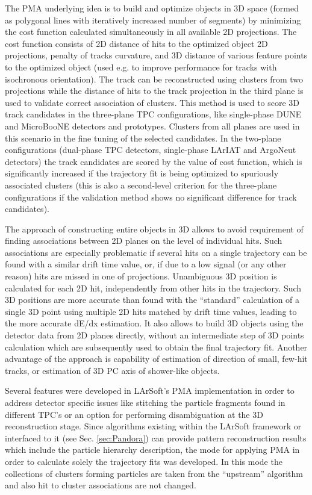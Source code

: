 The PMA underlying idea is to build and optimize objects in 3D space (formed as polygonal lines with iteratively increased number of segments) by minimizing the cost function calculated simultaneously in all available 2D projections. The cost function consists of 2D distance of hits to the optimized object 2D projections, penalty of tracks curvature, and 3D distance of various feature points to the optimized object (used e.g. to improve performance for tracks with isochronous orientation). The track can be reconstructed using clusters from two projections while the distance of hits to the track projection in the third plane is used to validate correct association of clusters. This method is used to score 3D track candidates in the three-plane TPC configurations, like single-phase DUNE and MicroBooNE detectors and prototypes. Clusters from all planes are used in this scenario in the fine tuning of the selected candidates. In the two-plane configurations (dual-phase TPC detectors, single-phase LArIAT and ArgoNeut  detectors) the track candidates are scored by the value of cost function, which is significantly increased if the trajectory fit is being optimized to spuriously associated clusters (this is also a second-level criterion for the three-plane configurations if the validation method shows no significant difference for track candidates).


The approach of constructing entire objects in 3D allows to avoid requirement of finding associations between 2D planes on the level of individual hits. Such associations are especially problematic if several hits on a single trajectory can be found with a similar drift time value, or, if due to a low signal (or any other reason) hits are missed in one of projections. Unambiguous 3D position is calculated for each 2D hit, independently from other hits in the trajectory. Such 3D positions are more accurate than found with the ``standard'' calculation of a single 3D point using multiple 2D hits matched by drift time values, leading to the more accurate dE/dx estimation. It also allows to build 3D objects using the detector data from 2D planes directly, without an intermediate step of 3D points calculation which are subsequently used to obtain the final trajectory fit. Another advantage of the approach is capability of estimation of direction of small, few-hit tracks, or estimation of 3D PC axis of shower-like objects.

Several features were developed in LArSoft's PMA implementation in order to address detector specific issues like stitching the particle fragments found in different TPC's or an option for performing disambiguation at the 3D reconstruction stage. Since algorithms existing within the LArSoft framework or interfaced to it (see Sec. \ref{sec:Pandora}) can provide pattern reconstruction results which include the particle hierarchy description, the mode for applying PMA in order to calculate solely the trajectory fits was developed. In this mode the collections of clusters forming particles are taken from the ``upstream'' algorithm and also hit to cluster associations are not changed.


